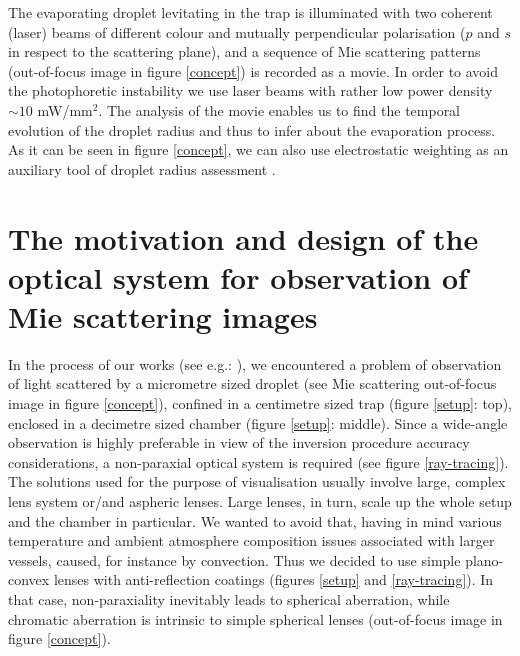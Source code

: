 \documentclass[preprint,review,12pt,dvips]{elsarticle}
\begin{document}
The evaporating droplet levitating in the trap is illuminated with two coherent (laser) beams of different colour and
mutually perpendicular polarisation ($p$ and $s$ in respect to the scattering plane), and a sequence of Mie scattering
patterns (out-of-focus image in figure \ref{concept}) is recorded as a movie. In order to avoid the photophoretic
instability we use laser beams with rather low power density $\sim 10$ mW/mm$^2$. The analysis of the movie enables us to
find the temporal evolution of the droplet radius and thus to infer about the evaporation process. As it can be seen in
figure \ref{concept}, we can also use electrostatic weighting as an auxiliary tool of droplet radius assessment
\cite{weightvsscatt}.

\section{The motivation and design of the optical system for observation of Mie scattering images}
In the process of our works (see e.g.: \cite{RoP,weightvsscatt}), we encountered a problem of observation of light
scattered by a micrometre sized droplet (see Mie scattering out-of-focus image in figure \ref{concept}), confined in a
centimetre sized trap (figure \ref{setup}: top), enclosed in a decimetre sized chamber (figure \ref{setup}: middle). Since
a wide-angle observation is highly preferable in view of the inversion procedure accuracy considerations, a non-paraxial
optical system is required (see figure \ref{ray-tracing}). The solutions used for the purpose of visualisation usually
involve large, complex lens system or/and aspheric lenses. Large lenses, in turn, scale up the whole setup and the chamber
in particular. We wanted to avoid that, having in mind various temperature and ambient atmosphere composition issues
associated with larger vessels, caused, for instance by convection. Thus we decided to use simple plano-convex lenses with
anti-reflection coatings (figures \ref{setup} and \ref{ray-tracing}). In that case, non-paraxiality inevitably leads to
spherical aberration, while chromatic aberration is intrinsic to simple spherical lenses (out-of-focus image in figure
\ref{concept}).
\end{document}
